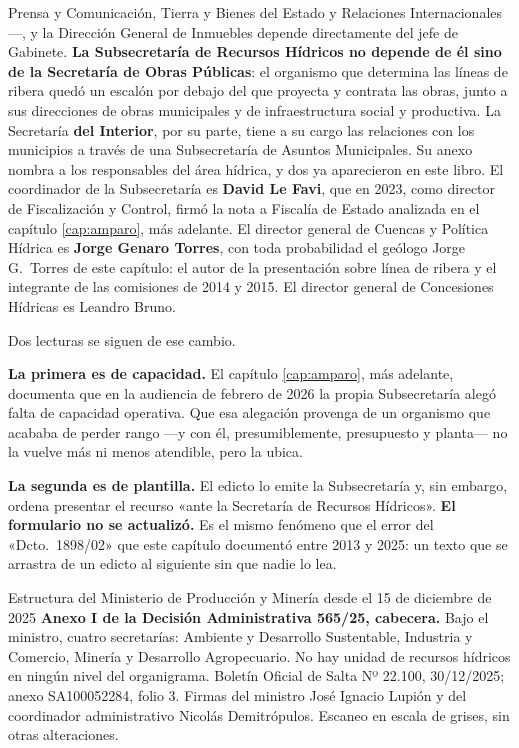 \begin{cautela}
Prensa y Comunicación, Tierra y Bienes del Estado y Relaciones Internacionales---, y la Dirección General de Inmuebles depende directamente del jefe de Gabinete. \textbf{La Subsecretaría de Recursos Hídricos no depende de él sino de la Secretaría de Obras Públicas}: el organismo que determina las líneas de ribera quedó un escalón por debajo del que proyecta y contrata las obras, junto a sus direcciones de obras municipales y de infraestructura social y productiva. La Secretaría \textbf{del Interior}, por su parte, tiene a su cargo las relaciones con los municipios a través de una Subsecretaría de Asuntos Municipales. Su anexo nombra a los responsables del área hídrica, y dos ya aparecieron en este libro. El coordinador de la Subsecretaría es \textbf{David Le Favi}, que en 2023, como director de Fiscalización y Control, firmó la nota a Fiscalía de Estado analizada en el capítulo \ref{cap:amparo}, más adelante. El director general de Cuencas y Política Hídrica es \textbf{Jorge Genaro Torres}, con toda probabilidad el geólogo Jorge G.\ Torres de este capítulo: el autor de la presentación sobre línea de ribera y el integrante de las comisiones de 2014 y 2015. El director general de Concesiones Hídricas es Leandro Bruno.

Dos lecturas se siguen de ese cambio.

\textbf{La primera es de capacidad.} El capítulo \ref{cap:amparo}, más adelante, documenta que en la audiencia
de febrero de 2026 la propia Subsecretaría alegó falta de capacidad operativa. Que esa
alegación provenga de un organismo que acababa de perder rango ---y con él, presumiblemente,
presupuesto y planta--- no la vuelve más ni menos atendible, pero la ubica.

\textbf{La segunda es de plantilla.} El edicto lo emite la Subsecretaría y, sin embargo, ordena
presentar el recurso «ante la Secretaría de Recursos Hídricos». \textbf{El formulario no se
actualizó.} Es el mismo fenómeno que el error del «Dcto.\ 1898/02» que este capítulo documentó
entre 2013 y 2025: un texto que se arrastra de un edicto al siguiente sin que nadie lo lea.
\end{cautela}

 {Estructura del Ministerio de Producción y Minería desde el 15 de diciembre de 2025} {\textbf{Anexo I de la Decisión Administrativa 565/25, cabecera.} Bajo el ministro, cuatro secretarías: Ambiente y Desarrollo Sustentable, Industria y Comercio, Minería y Desarrollo Agropecuario. No hay unidad de recursos hídricos en ningún nivel del organigrama.} {Boletín Oficial de Salta Nº 22.100, 30/12/2025; anexo SA100052284, folio 3. Firmas del ministro José Ignacio Lupión y del coordinador administrativo Nicolás Demitrópulos. Escaneo en escala de grises, sin otras alteraciones.}

